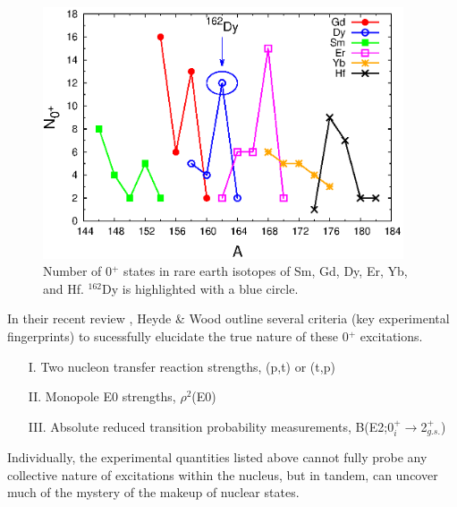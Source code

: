 \begin{figure}[ht]
\begin{center}
\includegraphics[width=0.95\textwidth]{figures/Gd_Dy_0s_Number.eps}
\end{center}
\caption{Number of 0$^+$ states in rare earth isotopes of Sm, Gd, Dy, Er, Yb, and Hf. $^{162}$Dy is highlighted with a blue circle. \label{fig:Number_0s_Rare_Earth}}
\end{figure}
\newpage
In their recent review \cite{RevModPhys.83.1467}, Heyde \& Wood outline several criteria (key experimental fingerprints) to sucessfully elucidate the true nature of these 0$^+$ excitations. 

\begin{itemize}
\item[I.] Two nucleon transfer reaction strengths, (p,t) or (t,p)
\item[II.] Monopole E0 strengths, $\rho^2$(E0)
\item[III.] Absolute reduced transition probability measurements, B(E2;0$^+_i\rightarrow$2$^+_{g.s.}$)

\end{itemize}

Individually, the experimental quantities listed above cannot fully probe any collective nature of excitations within the nucleus, but in tandem, can uncover much of the mystery of the makeup of nuclear states.

